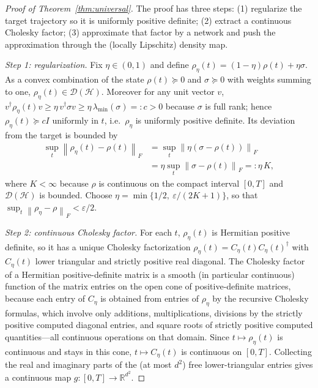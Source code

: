\documentclass[twocolumn,aps,prxquantum,superscriptaddress,nofootinbib,floatfix,longbibliography]{revtex4-2}
\newcommand{\R}{\mathbb{R}}
\newcommand{\calD}{\mathcal{D}}
\newcommand{\eps}{\varepsilon}
\newcommand{\norm}[1]{\left\lVert #1 \right\rVert}
\newcommand{\hilb}{\mathcal{H}}
\begin{document}
\begin{proof}[Proof of Theorem~\ref{thm:universal}]
The proof has three steps: (1) regularize the target trajectory so it is uniformly positive definite; (2) extract a continuous Cholesky factor; (3) approximate that factor by a network and push the approximation through the (locally Lipschitz) density map.

\emph{Step 1: regularization.} Fix $\eta\in(0,1)$ and define $\rho_\eta(t)=(1-\eta)\rho(t)+\eta\sigma$. As a convex combination of the state $\rho(t)\succeq0$ and $\sigma\succeq0$ with weights summing to one, $\rho_\eta(t)\in\calD(\hilb)$. Moreover for any unit vector $v$, $v^\dagger\rho_\eta(t)v\ge\eta\, v^\dagger\sigma v\ge\eta\,\lambda_{\min}(\sigma)=:c>0$ because $\sigma$ is full rank; hence $\rho_\eta(t)\succeq cI$ uniformly in $t$, i.e.\ $\rho_\eta$ is uniformly positive definite. Its deviation from the target is bounded by
\begin{equation*}
\begin{aligned}
\sup_t\norm{\rho_\eta(t)-\rho(t)}_F&=\sup_t\norm{\eta(\sigma-\rho(t))}_F\\
&=\eta\sup_t\norm{\sigma-\rho(t)}_F=:\eta\,K,
\end{aligned}
\end{equation*}
where $K<\infty$ because $\rho$ is continuous on the compact interval $[0,T]$ and $\calD(\hilb)$ is bounded. Choose $\eta=\min\{1/2,\ \eps/(2K+1)\}$, so that $\sup_t\norm{\rho_\eta-\rho}_F<\eps/2$.

\emph{Step 2: continuous Cholesky factor.} For each $t$, $\rho_\eta(t)$ is Hermitian positive definite, so it has a unique Cholesky factorization $\rho_\eta(t)=C_\eta(t)C_\eta(t)^\dagger$ with $C_\eta(t)$ lower triangular and strictly positive real diagonal. The Cholesky factor of a Hermitian positive-definite matrix is a smooth (in particular continuous) function of the matrix entries on the open cone of positive-definite matrices, because each entry of $C_\eta$ is obtained from entries of $\rho_\eta$ by the recursive Cholesky formulas, which involve only additions, multiplications, divisions by the strictly positive computed diagonal entries, and square roots of strictly positive computed quantities---all continuous operations on that domain. Since $t\mapsto\rho_\eta(t)$ is continuous and stays in this cone, $t\mapsto C_\eta(t)$ is continuous on $[0,T]$. Collecting the real and imaginary parts of the (at most $d^2$) free lower-triangular entries gives a continuous map $g:[0,T]\to\R^{d^2}$.


\end{proof}
\end{document}
